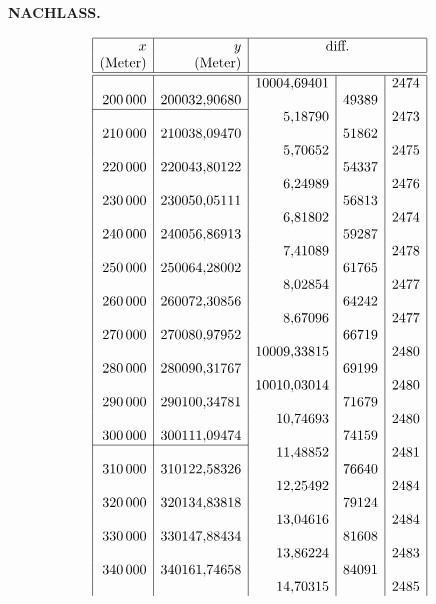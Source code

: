 \par\clearpage
{}\hfill{\small\textbf{NACHLASS.}}\hfill\null\par\medskip
{\footnotesize\renewcommand{\arraystretch}{.63}
\[\begin{array}{|r|r|r|r|r|}\hline
\rule{0pt}{2ex}x&y&\multicolumn{3}{c|}{\text{diff.}}\\
\text{(Meter)}&\text{(Meter)}&\multicolumn{3}{c|}{}\\\hline\hline
&&10004{,}69401&&2474\\
200\,000&200032{,}90680&&49389&\\
\cline{1-2}
&&5{,}18790&&2473\\
210\,000&210038{,}09470&&51862&\\
&&5{,}70652&&2475\\
220\,000&220043{,}80122&&54337&\\
&&6{,}24989&&2476\\
230\,000&230050{,}05111&&56813&\\
&&6{,}81802&&2474\\
240\,000&240056{,}86913&&59287&\\
&&7{,}41089&&2478\\
250\,000&250064{,}28002&&61765&\\
&&8{,}02854&&2477\\
260\,000&260072{,}30856&&64242&\\
&&8{,}67096&&2477\\
270\,000&270080{,}97952&&66719&\\
&&10009{,}33815&&2480\\
280\,000&280090{,}31767&&69199&\\
&&10010{,}03014&&2480\\
290\,000&290100{,}34781&&71679&\\
&&10{,}74693&&2480\\
300\,000&300111{,}09474&&74159&\\
\cline{1-2}
&&11{,}48852&&2481\\
310\,000&310122{,}58326&&76640&\\
&&12{,}25492&&2484\\
320\,000&320134{,}83818&&79124&\\
&&13{,}04616&&2484\\
330\,000&330147{,}88434&&81608&\\
&&13{,}86224&&2483\\
340\,000&340161{,}74658&&84091&\\
&&14{,}70315&&2485\\

\end{array}\]}
